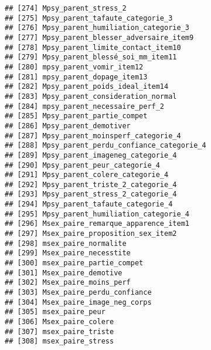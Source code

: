\documentclass[
]{article}
\begin{document}
\begin{verbatim}
## [274] Mpsy_parent_stress_2                                             
## [275] Mpsy_parent_tafaute_categorie_3                                  
## [276] Mpsy_parent_humiliation_categorie_3                              
## [277] Mpsy_parent_blesser_adversaire_item9                             
## [278] Mpsy_parent_limite_contact_item10                                
## [279] Mpsy_parent_blessé_soi_mm_item11                                 
## [280] mpsy_parent_vomir_item12                                         
## [281] mpsy_parent_dopage_item13                                        
## [282] Mpsy_parent_poids_ideal_item14                                   
## [283] Mpsy_parent_consideration_normal                                 
## [284] mpsy_parent_necessaire_perf_2                                    
## [285] Mpsy_parent_partie_compet                                        
## [286] Mpsy_parent_demotiver                                            
## [287] Mpsy_parent_moinsperf_categorie_4                                
## [288] Mpsy_parent_perdu_confiance_categorie_4                          
## [289] Mpsy_parent_imageneg_categorie_4                                 
## [290] Mpsy_parent_peur_categorie_4                                     
## [291] Mpsy_parent_colere_categorie_4                                   
## [292] Mpsy_parent_triste_2_categorie_4                                 
## [293] Mpsy_parent_stress_2_categorie_4                                 
## [294] Mpsy_parent_tafaute_categorie_4                                  
## [295] Mpsy_parent_humiliation_categorie_4                              
## [296] Msex_paire_remarque_apparence_item1                              
## [297] Msex_paire_proposition_sex_item2                                 
## [298] msex_paire_normalite                                             
## [299] Msex_paire_necesstite                                            
## [300] msex_paire_partie_compet                                         
## [301] Msex_paire_demotive                                              
## [302] Msex_paire_moins_perf                                            
## [303] Msex_paire_perdu_confiance                                       
## [304] Msex_paire_image_neg_corps                                       
## [305] msex_paire_peur                                                  
## [306] Msex_paire_colere                                                
## [307] msex_paire_triste                                                
## [308] msex_paire_stress                                                

\end{verbatim}
\end{document}
